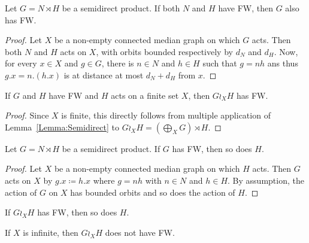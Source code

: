 \begin{lem}\label{Lemma:Semidirect}
Let $G=N\rtimes H$ be a semidirect product.
If both $N$ and $H$ have FW, then $G$ also has FW.
\end{lem}
\begin{proof}
Let $X$ be a non-empty connected median graph on which $G$ acts.
Then both $N$ and $H$ acts on $X$, with orbits bounded respectively by $d_N$ and $d_H$.
Now, for every $x\in X$ and $g\in G$, there is $n\in N$ and $h\in H$ such that $g=nh$ ans thus $g.x=n.(h.x)$ is at distance at most $d_N+d_H$ from $x$.
\end{proof}
\begin{cor}\label{Cor:Wreath}
If $G$ and $H$ have FW and $H$ acts on a finite set $X$, then $G\wr_X H$ has FW.
\end{cor}
\begin{proof}
Since $X$ is finite, this directly follows from multiple application of Lemma~\ref{Lemma:Semidirect} to $G\wr_X H=(\bigoplus_X G)\rtimes H$.
\end{proof}
\begin{lem}
Let $G=N\rtimes H$ be a semidirect product.
If $G$ has FW, then so does $H$.
\end{lem}
\begin{proof}
Let $X$ be a non-empty connected median graph on which $H$ acts.
Then $G$ acts on $X$ by $g.x\coloneqq h.x$ where $g=nh$ with $n\in N$ and $h\in H$.
By assumption, the action of $G$ on $X$ has bounded orbits and so does the action of $H$.
\end{proof}
\begin{cor}\label{Cor:Wreath2}
If $G\wr_X H$ has FW, then so does $H$.
\end{cor}
\begin{prop}[Cornullier]\label{Prop:Cornullier}
If $X$ is infinite, then $G\wr_X H$ does not have FW.
\end{prop}
